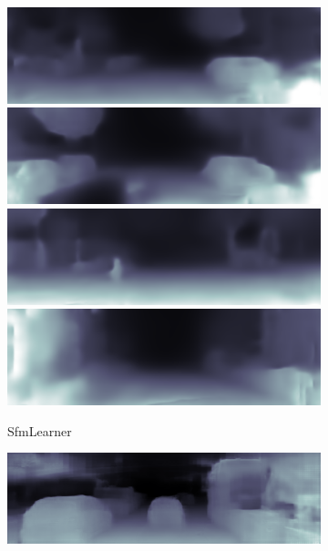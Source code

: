 \begin{figure}[htb]
\begin{subfigure}{0.15\linewidth}
\begin{minipage}[b]{1\linewidth}
  \includegraphics[width=1\linewidth]{figure/kitti_sfm/2011_09_26_drive_0009_sync_0000000260.png}\vspace{3.5pt}
  \includegraphics[width=1\linewidth]{figure/kitti_sfm/2011_09_26_drive_0009_sync_0000000340.png}\vspace{3.5pt}
  \includegraphics[width=1\linewidth]{figure/kitti_sfm/2011_09_26_drive_0009_sync_0000000388.png}\vspace{3.5pt}
  \includegraphics[width=1\linewidth]{figure/kitti_sfm/2011_09_30_drive_0018_sync_0000000642.png}
  \end{minipage}
  \caption{SfmLearner~\cite{zhou2017unsupervised}}
  \end{subfigure}
  \begin{subfigure}{0.15\linewidth}
  \begin{minipage}[b]{1\linewidth}
  \includegraphics[width=1\linewidth]{figure/kitti_without/2011_09_26_drive_0052_sync_0000000000.png}\vspace{5pt}

\end{minipage}
\end{subfigure}
\end{figure}
